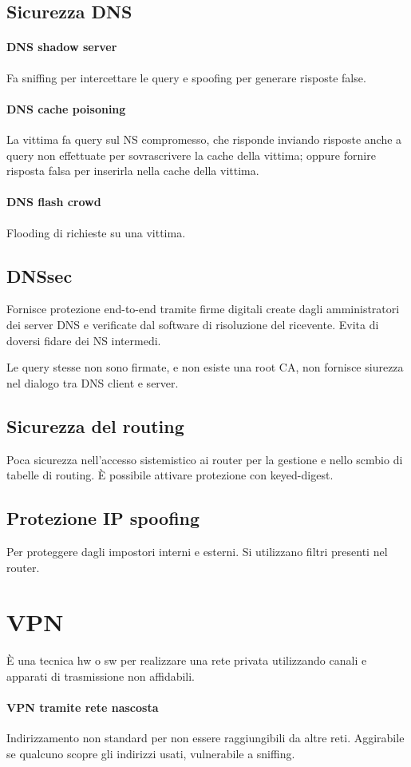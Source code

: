 \documentclass[11pt]{article}
\begin{document}
\subsection{Sicurezza DNS}
\paragraph*{DNS shadow server}
Fa sniffing per intercettare le query e spoofing per generare risposte false.
\paragraph*{DNS cache poisoning}
La vittima fa query sul NS compromesso, che risponde inviando risposte anche a query non effettuate per sovrascrivere la 
cache della vittima; oppure fornire risposta falsa per inserirla nella cache della vittima.
\paragraph*{DNS flash crowd}
Flooding di richieste su una vittima.
\subsection{DNSsec}
Fornisce protezione end-to-end tramite firme digitali create dagli amministratori dei server DNS e verificate dal software 
di risoluzione del ricevente. Evita di doversi fidare dei NS intermedi.

Le query stesse non sono firmate, e non esiste una root CA, non fornisce siurezza nel dialogo tra DNS client e server.
\subsection{Sicurezza del routing}
Poca sicurezza nell'accesso sistemistico ai router per la gestione e nello scmbio di tabelle di routing. È possibile attivare
protezione con keyed-digest.
\subsection{Protezione IP spoofing}
Per proteggere dagli impostori interni e esterni. Si utilizzano filtri presenti nel router.
\section{VPN}
È una tecnica hw o sw per realizzare una rete privata utilizzando canali e apparati di trasmissione non affidabili. 
\paragraph*{VPN tramite rete nascosta}
Indirizzamento non standard per non essere raggiungibili da altre reti. Aggirabile se qualcuno scopre gli indirizzi usati,
vulnerabile a sniffing.
\end{document}
